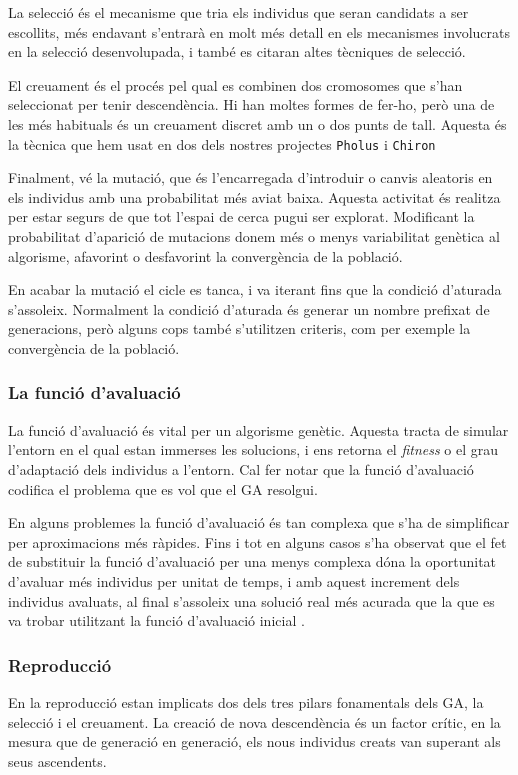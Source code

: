 La selecció és el mecanisme que tria els individus que seran candidats a ser
escollits, més endavant s'entrarà en molt més detall en els mecanismes
involucrats en la selecció desenvolupada, i també es citaran altes tècniques de
selecció.

El creuament és el procés pel qual es combinen dos cromosomes que s'han
seleccionat per tenir descendència. Hi han moltes formes de fer-ho, però una de
les més habituals és un creuament discret amb un o dos punts de tall.  Aquesta
és la tècnica que hem usat en dos dels nostres projectes \texttt{Pholus} i
\texttt{Chiron}  %

Finalment, vé la mutació, que és l'encarregada d'introduir o canvis aleatoris en
els individus amb una probabilitat més aviat baixa. Aquesta activitat és
realitza per estar segurs de que tot l'espai de cerca pugui ser explorat.
Modificant la probabilitat d'aparició de mutacions donem més o menys
variabilitat genètica al algorisme, afavorint o desfavorint la convergència de
la població.

En acabar la mutació el cicle es tanca, i va iterant fins que la condició
d'aturada s'assoleix. Normalment la condició d'aturada és generar un nombre
prefixat de generacions, però alguns cops també s'utilitzen criteris, com per
exemple la convergència de la població.

\subsubsection{La funció d'avaluació\label{subsec:avaluacio}} La funció
d'avaluació és vital per un algorisme genètic. Aquesta tracta de simular
l'entorn en el qual estan immerses les solucions, i ens retorna el
\emph{fitness} o el grau d'adaptació dels individus a l'entorn. Cal fer notar
que la funció d'avaluació codifica el problema que es vol que el GA resolgui.

En alguns problemes la funció d'avaluació és tan complexa que s'ha de
simplificar per aproximacions més ràpides. Fins i tot en alguns casos s'ha
observat que el fet de substituir la funció d'avaluació per una menys complexa
dóna la oportunitat d'avaluar més individus per unitat de temps, i amb aquest
increment dels individus avaluats, al final s'assoleix una solució real més
acurada que la que es va trobar utilitzant la funció d'avaluació inicial
\cite{G89}. 

\subsubsection{Reproducció} En la reproducció estan implicats dos dels tres
pilars fonamentals dels GA, la selecció i el creuament. La creació de nova
descendència és un factor crític, en la mesura que de generació en generació,
els nous individus creats van superant als seus ascendents.

